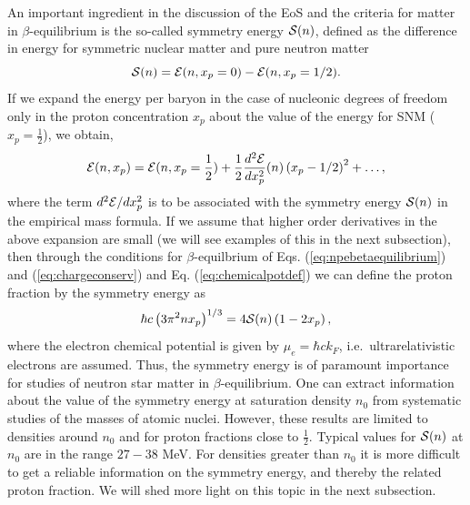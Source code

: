 \documentclass[%
oneside,                 %
final,                   %
10pt]{article}
\begin{document}
An important ingredient in the discussion of the EoS and the criteria for
matter in $\beta$-equilibrium is the so-called symmetry energy ${\cal S} (n)$, 
defined as
the difference in energy for symmetric nuclear matter
and pure neutron matter 
\begin{equation}
      {\cal S} (n) = {\cal E} (n,x_p=0) - {\cal E} (n,x_p=1/2 ).
      \label{eq:symenergy}
\end{equation}
If we expand the energy per baryon in the case of nucleonic degrees of freedom 
only
in the proton concentration $x_p$ about the value of the energy 
for SNM ($x_p=\frac{1}{2}$), we obtain,
\begin{equation}
     {\cal E} (n,x_p)={\cal E} (n,x_p=\frac{1}{2})+
     \frac{1}{2}\frac{d^2 {\cal E}}{dx_p^2} (n)\left(x_p-1/2\right)^2+\dots ,
     \label{eq:energyexpansion}
\end{equation}
where the term $d^2 {\cal E}/dx_p^2$ 
is to be associated with the symmetry energy ${\cal S} (n)$ in the empirical
mass formula. If
we assume that higher order derivatives in the above expansion are small
(we will see examples of this in the next subsection), then through the 
conditions
for $\beta$-equilbrium of Eqs. (\ref{eq:npebetaequilibrium}) and 
(\ref{eq:chargeconserv})
and Eq. (\ref{eq:chemicalpotdef}) we can define the proton
fraction by the symmetry energy as
\begin{equation}  
    \hbar c\left(3\pi^2nx_p\right)^{1/3} = 4{\cal S} (n)\left(1-2x_p\right),
    \label{eq:crudeprotonfraction}
\end{equation}
where the electron chemical potential is given
by $\mu_e = \hbar c k_F$, i.e.\  ultrarelativistic electrons are assumed.
Thus, the symmetry energy is of paramount importance for studies 
of neutron star matter in $\beta$-equilibrium.
One can extract information about the value of the symmetry energy at saturation 
density
$n_0$ from systematic studies of the masses of atomic nuclei. However, these 
results
are limited to densities around $n_0$ and for proton fractions close to 
$\frac{1}{2}$.
Typical values for ${\cal S} (n)$ at $n_0$ are in the range $27-38$ MeV.
For densities greater than $n_0$ it is more difficult to get a reliable 
information on the symmetry energy, and thereby the related proton fraction.
We will shed more light on this topic in the next subsection.
\end{document}
